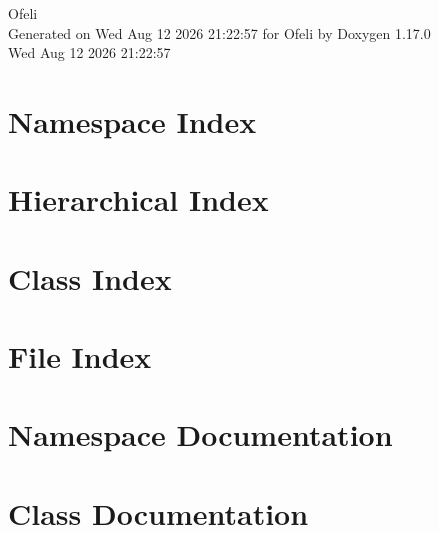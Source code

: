 \documentclass[twoside]{book}
\newcommand{\+}{\discretionary{\mbox{\scriptsize$\hookleftarrow$}}{}{}}
\newcommand{\clearemptydoublepage}{%
    \newpage{\pagestyle{empty}\cleardoublepage}%
  }
\begin{document}
  \raggedbottom
    \hypersetup{pageanchor=false,
                bookmarksnumbered=true,
                pdfencoding=unicode
               }
  \begin{titlepage}
  \vspace*{7cm}
  \begin{center}%
  {\Large Ofeli}\\
  \vspace*{1cm}
  {\large Generated on Wed Aug 12 2026 21:\+22:\+57 for Ofeli by Doxygen 1.17.0}\\
    \vspace*{0.5cm}
    {\small Wed Aug 12 2026 21:22:57}
  \end{center}
  \end{titlepage}
  \clearemptydoublepage
  \tableofcontents
  \clearemptydoublepage
  \hypersetup{pageanchor=true}



\chapter{Namespace Index}

\chapter{Hierarchical Index}

\chapter{Class Index}

\chapter{File Index}

\chapter{Namespace Documentation}

\chapter{Class Documentation}



















\end{document}
